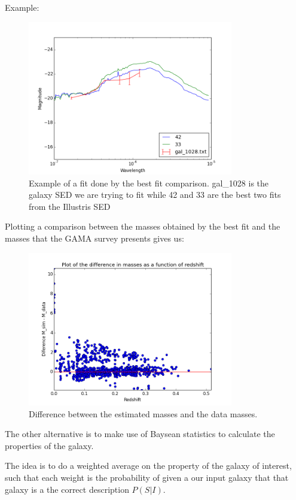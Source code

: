 \documentclass[11pt]{report}
\begin{document}
Example:
\begin{figure}[H]
\centering
\includegraphics[width = 0.8\textwidth]{Graphs/42_33_gal_1028.png}
\caption{Example of a fit done by the best fit comparison. gal\_1028 is the galaxy SED we are trying to fit while 42 and 33 are the best two fits from the Illustris SED}
\end{figure}

Plotting a comparison between the masses obtained by the best fit and the masses that the GAMA survey presents gives us:
\begin{figure}[H]
\centering
\includegraphics[width = 0.8\textwidth]{Fits_Galax/red_dif.png}
\caption{Difference between the estimated masses and the data masses.}
\end{figure}

The other alternative is to make use of Baysean statistics to calculate the properties of the galaxy.

The idea is to do a weighted average on the property of the galaxy of interest, such that each weight is the probability of given a our input galaxy that that galaxy is a the correct description $P(S|I)$.
\end{document}

